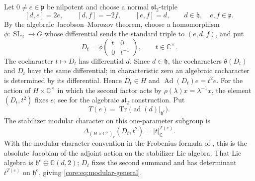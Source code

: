 \documentclass[10pt,a4paper]{amsart}
\numberwithin{equation}{section}
\newcommand{\C}{\mathbb C}
\newcommand{\SL}{\operatorname{SL}}
\newcommand{\Ad}{\operatorname{Ad}}
\newcommand{\ad}{\operatorname{ad}}
\newcommand{\Tr}{\operatorname{Tr}}
\newcommand{\fh}{\mathfrak h}
\newcommand{\fp}{\mathfrak p}
\newcommand{\absC}[1]{\lvert #1\rvert_{\C}}
\begin{document}
Let $0\ne e\in\fp$ be nilpotent and choose a normal $\mathfrak{sl}_2$-triple
\begin{equation}\label{core:eq:normal-triple-general}
 [d,e]=2e,\qquad [d,f]=-2f,\qquad [e,f]=d,
 \qquad d\in\fh,\quad e,f\in\fp.
\end{equation}
By the algebraic Jacobson--Morozov theorem, choose a homomorphism
$\phi:\SL_2\to G$ whose differential sends the standard triple to
$(e,d,f)$, and put
\begin{equation}\label{core:eq:Dt-algebraic}
 D_t=\phi\!\begin{pmatrix}t&0\\0&t^{-1}\end{pmatrix},
 \qquad t\in\C^\times.
\end{equation}
The cocharacter $t\mapsto D_t$ has differential $d$.  Since
$d\in\fh$, the cocharacters $\theta(D_t)$ and $D_t$ have the same
differential; in characteristic zero an algebraic cocharacter is determined
by its differential.  Hence $D_t\in H$ and $\Ad(D_t)e=t^2e$.  For the
action of $H\times\C^\times$ in which the second factor acts by
$\rho(\lambda)x=\lambda^{-1}x$, the element $(D_t,t^2)$ fixes $e$; see
\cite[\S3.2]{CM} for the algebraic $\mathfrak{sl}_2$ construction.  Put
\begin{equation}\label{core:eq:T-of-e}
 T(e)=\Tr\bigl(\ad(d)|_{\fh^e}\bigr).
\end{equation}
The stabilizer modular character on this one-parameter subgroup is
\begin{equation}\label{core:eq:modular-general}
 \Delta_{(H\times\C^\times)_e}(D_t,t^2)=\absC{t}^{T(e)}.
\end{equation}
With the modular-character convention in the Frobenius formula of
\cite[Theorem~2.5.7]{AG09}, this is the absolute Jacobian of the adjoint
action on the stabilizer Lie algebra.  That Lie algebra is
$\fh^e\oplus\C(d,2)$; $D_t$ fixes the second summand and has determinant
$t^{T(e)}$ on $\fh^e$, giving \eqref{core:eq:modular-general}.
\end{document}
